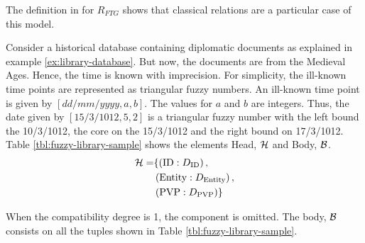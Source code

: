 The definition in \cite{Medina1994} for $R_{FTG}$ shows that classical relations are a particular case of this model. 

\begin{example}
\label{ex:sample-ft-database}
 Consider a historical database containing diplomatic documents as explained in example \ref{ex:library-database}. But now, the documents are from the Medieval Ages. Hence, the time is known with imprecision. For simplicity, the ill-known time points are represented as triangular fuzzy numbers. An ill-known time point is given by $[dd/mm/yyyy,a,b]$. The values for $a$ and $b$ are integers. Thus, the date given by $[15/3/1012,5,2]$ is a triangular fuzzy number with the left bound the 10/3/1012, the core on the 15/3/1012 and the right bound on 17/3/1012.
Table \ref{tbl:fuzzy-library-sample} shows the elements Head, $\mathcal{H}$ and Body, $\mathcal{B}$. 
\begin{align}
 \label{eq:head-ex}
\mathcal{H} = & \lbrace \left(\text{ID}:D_{\text{ID}}\right),\\
\nonumber
&  \left(\text{Entity}:D_{\text{Entity}}\right),\\
\nonumber
& \left(\text{PVP}:D_{\text{PVP}}\right) \rbrace
\end{align}

When the compatibility degree is 1, the component is omitted. The body, $\mathcal{B}$ consists on all the tuples shown in Table \ref{tbl:fuzzy-library-sample}. 

\end{example}



